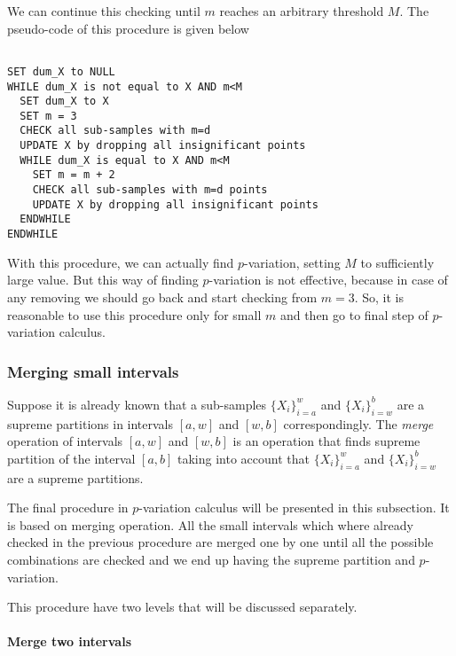 \documentclass[12pt, a4paper]{article}
\numberwithin{equation}{section}
\begin{document}
We can continue this checking until $m$ 
reaches an arbitrary threshold $M$.
The  pseudo-code  of this procedure is given below
\begin{lstlisting}

SET dum_X to NULL
WHILE dum_X is not equal to X AND m<M
  SET dum_X	to X
  SET m = 3
  CHECK all sub-samples with m=d 
  UPDATE X by dropping all insignificant points
  WHILE dum_X is equal to X AND	m<M
    SET m = m + 2
    CHECK all sub-samples with m=d points
    UPDATE X by dropping all insignificant points
  ENDWHILE  
ENDWHILE

\end{lstlisting}


With this procedure, we can actually find 
$p$-variation, setting $M$ to sufficiently large value.
But this way of finding $p$-variation is not effective, 
because in case of any removing 
we should go back and start checking
from $m=3$.
So, it is reasonable to use this procedure
only for small $m$ and then go
to final step of $p$-variation calculus.





\subsubsection{Merging small intervals}
\label{sec:meging}



Suppose it is already known that 
a sub-samples $\{X_{i}\}_{i=a}^{w}$  and $\{X_{i}\}_{i=w}^{b}$
are a supreme partitions in intervals $[a,w]$ and $[w,b]$ correspondingly. 
The \emph{merge} operation of intervals $[a,w]$ and $[w,b]$ is
an operation that finds supreme partition 
of the interval $[a,b]$ taking into account
that  $\{X_{i}\}_{i=a}^{w}$  and $\{X_{i}\}_{i=w}^{b}$
are a supreme partitions.

The final procedure in $p$-variation calculus will be
presented in this subsection. It is based on
merging operation.
All the small intervals which where already checked in the 
previous procedure are merged one by one until all the
possible combinations are checked and we end up having
the supreme partition and $p$-variation.

This procedure have two levels that will be discussed separately.

\paragraph{Merge two intervals}
\end{document}
